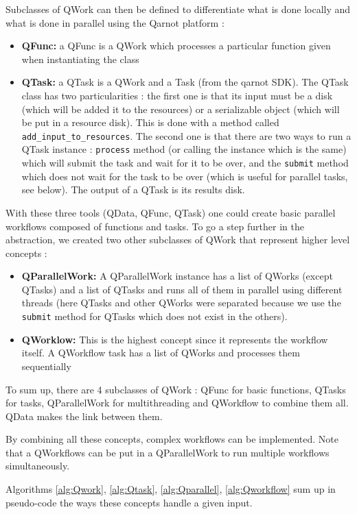 \documentclass[10pt, conference, compsocconf]{IEEEtran}
\begin{document}
Subclasses of QWork can then be defined to differentiate what is done locally and what is done in parallel using the Qarnot platform : 
\begin{itemize}
\item \textbf{QFunc:} a QFunc is a QWork which processes a particular function given when instantiating the class
\item \textbf{QTask:} a QTask is a QWork and a Task (from the qarnot SDK). The QTask class has two particularities : 
the first one is that its input must be a disk (which will be added it to the resources) or a serializable object (which will be put in a resource disk). This is done with a method called \texttt{add\_input\_to\_resources}. The second one is that there are two ways to run a QTask instance : \texttt{process} method (or calling the instance which is the same) which will submit the task and wait for it to be over, and the \texttt{submit} method which does not wait for the task to be over (which is useful for parallel tasks, see below). The output of a QTask is its results disk.
\end{itemize}
With these three tools (QData, QFunc, QTask) one could create basic parallel workflows composed of functions and tasks. To go a step further in the abstraction, we created two other subclasses of QWork that represent higher level concepts : 
\begin{itemize}
\item \textbf{QParallelWork:} A QParallelWork instance has a list of QWorks (except QTasks) and a list of QTasks and runs all of them in parallel using different threads (here QTasks and other QWorks were separated because we use the \texttt{submit} method for QTasks which does not exist in the others).
\item \textbf{QWorklow:} This is the highest concept since it represents the workflow itself. A QWorkflow task has a list of QWorks and processes them sequentially
\end{itemize}
To sum up, there are 4 subclasses of QWork : QFunc for basic functions, QTasks for tasks, QParallelWork for multithreading and QWorkflow to combine them all. QData makes the link between them.

By combining all these concepts, complex workflows can be implemented. Note that a QWorkflows can be put in a QParallelWork to run multiple workflows simultaneously. 

Algorithms \ref{alg:Qwork}, \ref{alg:Qtask}, \ref{alg:Qparallel}, \ref{alg:Qworkflow} sum up in pseudo-code the ways these concepts handle a given input. 
\end{document}
